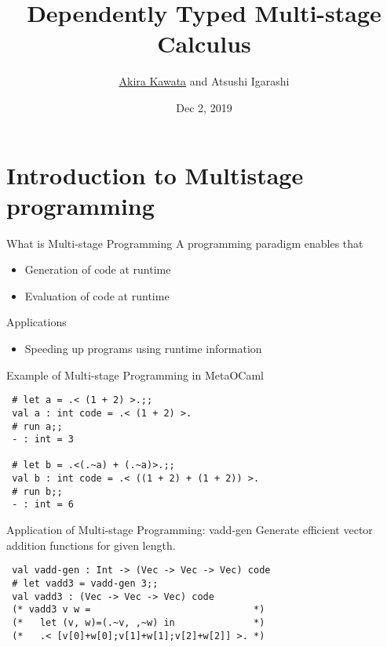 \documentclass[dvipdfmx,aspectratio=169, 20pt]{beamer}
\title{Dependently Typed Multi-stage Calculus}
\author{\underline{Akira Kawata} and Atsushi Igarashi}
\institute{Gradudate School of Informatics, Kyoto University}
\date{Dec 2, 2019}
\begin{document}
\maketitle


\section{Introduction to Multistage programming}

\begin{frame}[fragile]{What is Multi-stage Programming}
    A programming paradigm enables that
    \begin{itemize}
        \item Generation of code at runtime
        \item Evaluation of code at runtime
    \end{itemize}
    Applications
    \begin{itemize}
        \item Speeding up programs using runtime information
    \end{itemize}
    \note{
    }
\end{frame}

\begin{frame}[fragile]{Example of Multi-stage Programming in MetaOCaml}
    \begin{center}
        \begin{verbatim}
 # let a = .< (1 + 2) >.;;
 val a : int code = .< (1 + 2) >.
 # run a;;
 - : int = 3

 # let b = .<(.~a) + (.~a)>.;;
 val b : int code = .< ((1 + 2) + (1 + 2)) >. 
 # run b;;
 - : int = 6
        \end{verbatim}
    \end{center}
    \note{
    }
\end{frame}

\begin{frame}[fragile]{Application of Multi-stage Programming: vadd-gen}
    Generate efficient vector addition functions for given length.
    
    \begin{verbatim}
 val vadd-gen : Int -> (Vec -> Vec -> Vec) code
 # let vadd3 = vadd-gen 3;;
 val vadd3 : (Vec -> Vec -> Vec) code
 (* vadd3 v w =                             *)
 (*   let (v, w)=(.~v, ,~w) in              *)
 (*   .< [v[0]+w[0];v[1]+w[1];v[2]+w[2]] >. *)
    \end{verbatim}
    \note{
    }
\end{frame}
\end{document}
